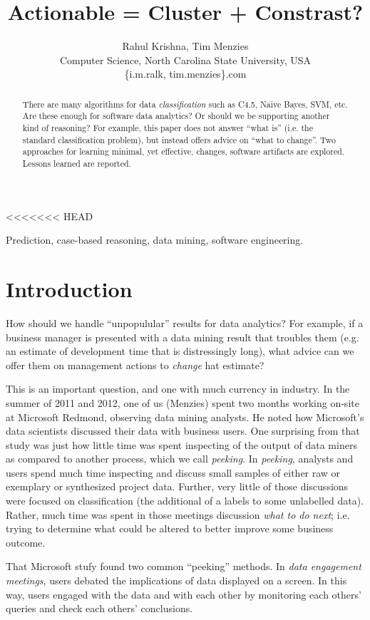 \documentclass[conference]{IEEEtran}
\title{Actionable = Cluster + Constrast?}
\author{Rahul Krishna, Tim Menzies\\
	Computer Science, North Carolina State University, USA\\
	\{i.m.ralk, tim.menzies\}\@gmail.com
	
}
\begin{document}
<<<<<<< HEAD
	\maketitle
	\begin{abstract}
		There are many
		algorithms for data {\em classification} such as  C4.5, Naive Bayes, SVM, etc.
		Are these enough for software data analytics? Or should we be supporting
		another kind of reasoning? For example, this paper does not answer 
		``what is'' (i.e. the standard classification problem), but instead  offers advice on ``what to change''.
		Two approaches for learning minimal, yet effective,  changes,  software
		artifacts are explored. Lessons learned are reported.
	\end{abstract}
	\begin{IEEEkeywords}
		Prediction, case-based reasoning, data mining, software engineering.
	\end{IEEEkeywords}
	
	\section{Introduction} 
	How should we handle ``unpopulular'' results
	for data analytics? For example, if a business manager is presented
	with a data mining result that troubles them (e.g. an estimate of
	development time that is distressingly long), what advice
	can we offer them on management actions to {\em change} hat estimate?
	
	This is an important question, and one with much currency in industry.
	In the summer of 2011 and 2012, one of us (Menzies) spent two months
	working on-site at Microsoft Redmond,
	observing data mining analysts.  He
	noted how Microsoft's data scientists
	discussed their data with  business users. 
	One surprising from that study was just how
	little time was spent  
	inspecting  of the output of data miners as compared to another process, which we call {\em peeking}.
	In {\em peeking}, analysts and users spend much time
	inspecting and discuss small samples of either raw or exemplary or synthesized project data.  Further, very little of those discussions were  focused on classification
	(the additional of a labels to some unlabelled data). Rather, much time
	was spent in those meetings discussion {\em what to do next}; i.e. trying
	to determine what could be altered to better improve some business outcome.
	
	That   Microsoft  stufy found two common ``peeking'' methods.
	In {\em data engagement meetings},
	users debated the implications of data
	displayed on a screen. In this way, users
	engaged with the data and with each other by
	monitoring each others' queries and check each others'
	conclusions.
	
\end{document}
